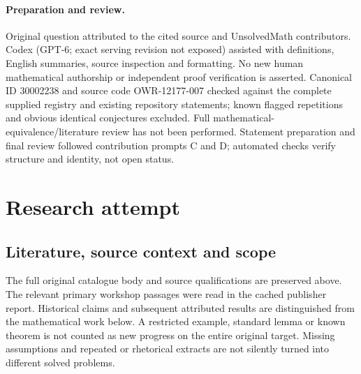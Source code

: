 \documentclass[11pt]{article}
\begin{document}
\paragraph{Preparation and review.}
Original question attributed to the cited source and UnsolvedMath contributors. Codex (GPT-6; exact serving revision not exposed) assisted with definitions, English summaries, source inspection and formatting. No new human mathematical authorship or independent proof verification is asserted. Canonical ID 30002238 and source code OWR-12177-007 checked against the complete supplied registry and existing repository statements; known flagged repetitions and obvious identical conjectures excluded. Full mathematical-equivalence/literature review has not been performed. Statement preparation and final review followed contribution prompts C and D; automated checks verify structure and identity, not open status.
\label{end:30002238}

\section{Research attempt}
\subsection{Literature, source context and scope}
The full original catalogue body and source qualifications are preserved above. The relevant primary workshop passages were read in the cached publisher report. Historical claims and subsequent attributed results are distinguished from the mathematical work below. A restricted example, standard lemma or known theorem is not counted as new progress on the entire original target. Missing assumptions and repeated or rhetorical extracts are not silently turned into different solved problems.
\end{document}
